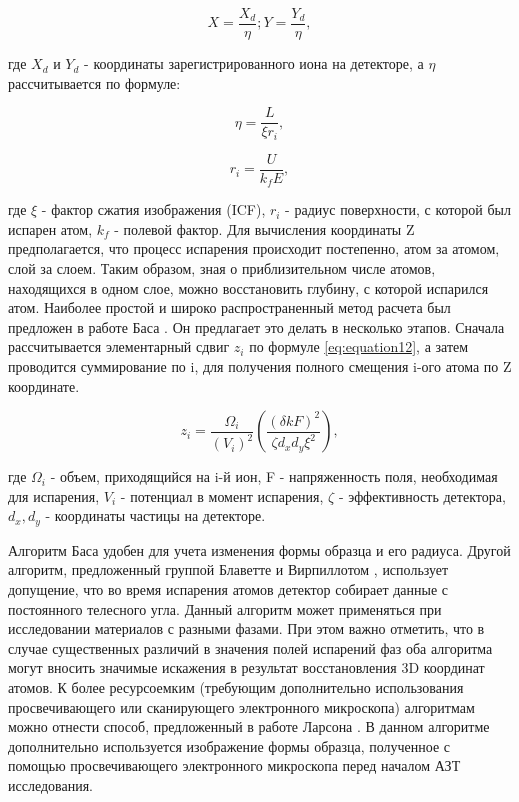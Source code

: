 \begin{equation}
	\label{eq:equation9}
	X = \frac{X_d}{\eta}; Y = \frac{Y_d}{\eta},
\end{equation} 

где $X_d$ и $Y_d$ - координаты зарегистрированного иона на детекторе, а $\eta$ рассчитывается по формуле:

\begin{equation}
	\label{eq:equation10}
	\eta = \frac{L}{\xi r_i},
\end{equation}

\begin{equation}
	\label{eq:equation11}
	r_i = \frac{U}{k_f E},
\end{equation}

где $\xi$ - фактор сжатия изображения (ICF), $r_i$ - радиус поверхности, с которой был испарен атом, $k_f$ - полевой фактор. Для вычисления координаты Z предполагается, что процесс испарения происходит постепенно, атом за атомом, слой за слоем. Таким образом, зная о приблизительном числе атомов, находящихся в одном слое, можно восстановить глубину, с которой испарился атом. Наиболее простой и широко распространенный метод расчета был предложен в работе Баса \cite{Bas95}. Он предлагает это делать в несколько этапов. Сначала рассчитывается элементарный сдвиг $z_i$ по формуле \cref{eq:equation12}, а затем проводится суммирование по i, для получения полного смещения i-ого атома по Z координате.

\begin{equation}
	\label{eq:equation12}
	z_i = \frac{\Omega_i}{(V_i)^2} \left(\frac{(\delta k F)^2}{\zeta d_x d_y \xi^2}\right),
\end{equation}

где  $\Omega_i$ - объем, приходящийся на i-й ион, F - напряженность поля, необходимая для испарения, $V_i$  - потенциал в момент испарения, $\zeta$ - эффективность детектора, $d_x, d_y$ - координаты частицы на детекторе.

Алгоритм Баса удобен для учета изменения формы образца и его радиуса. Другой алгоритм, предложенный группой Блаветте и Вирпиллотом \cite{Vurpillot11,Gault11}, использует допущение, что во время испарения атомов детектор собирает данные с постоянного телесного угла. Данный алгоритм может применяться при исследовании материалов с разными фазами. При этом важно отметить, что в случае существенных различий в значения полей испарений фаз оба алгоритма могут вносить значимые искажения в результат восстановления 3D координат атомов. К более ресурсоемким (требующим дополнительно использования просвечивающего или сканирующего электронного микроскопа) алгоритмам можно отнести способ, предложенный в работе Ларсона \cite{Larson11}. В данном алгоритме дополнительно используется изображение формы образца, полученное с помощью просвечивающего электронного микроскопа перед началом АЗТ исследования.

